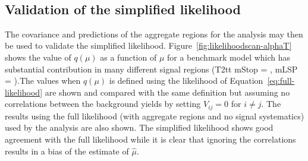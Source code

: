 \begin{figure}[!tbhp]
\begin{center}
     ~~
     \\
  \end{center}
\end{figure}

\subsection{Validation of the simplified likelihood}

The covariance and predictions of the aggregate regions for the \alphat analysis may then 
be used to validate the simplified likelihood. Figure~\ref{fig:likelihoodscan-alphaT} shows the value of $q(\mu)$ as a function of $\mu$ for 
a benchmark model which has substantial contribution in many different signal regions 
(T2tt mStop = , mLSP = ).The values when $q(\mu)$ is defined using the likelihood of Equation~\ref{eq:full-likelihood} 
are shown and compared with the same definition but assuming no correlations between the 
background yields by setting $V_{ij}=0$ for $i\neq j$. The results using the full likelihood (with aggregate regions and no signal systematics) 
used by the \alphat analysis are also shown. The simplified likelihood shows good agreement with the full likelihood 
while it is clear that ignoring the correlations results in a bias of the estimate of $\hat{\mu}$. 

